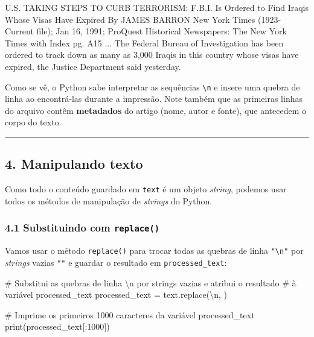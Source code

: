 \documentclass[
  brazilian,
  11pt,
]{article}
\newenvironment{Shaded}{\begin{snugshade}}{\end{snugshade}}
\newcommand{\BuiltInTok}[1]{\textcolor[rgb]{0.50,0.55,0.55}{#1}}
\newcommand{\CharTok}[1]{\textcolor[rgb]{0.24,0.68,0.91}{#1}}
\newcommand{\CommentTok}[1]{\textcolor[rgb]{0.48,0.49,0.49}{#1}}
\newcommand{\DecValTok}[1]{\textcolor[rgb]{0.96,0.45,0.00}{#1}}
\newcommand{\NormalTok}[1]{\textcolor[rgb]{0.81,0.81,0.76}{#1}}
\newcommand{\OperatorTok}[1]{\textcolor[rgb]{0.81,0.81,0.76}{#1}}
\newcommand{\StringTok}[1]{\textcolor[rgb]{0.96,0.31,0.31}{#1}}
\let\oldtexttt\texttt
\renewcommand{\texttt}[1]{{\color{inlink}\oldtexttt{#1}}}
\begin{document}
\begin{Shaded}
\begin{Highlighting}[]
\NormalTok{U.S. TAKING STEPS TO CURB TERRORISM: F.B.I. Is Ordered to Find Iraqis Whose Visas Have Expired}
\NormalTok{By JAMES BARRON}
\NormalTok{New York Times (1923{-}Current file); Jan 16, 1991;}
\NormalTok{ProQuest Historical Newspapers: The New York Times with Index pg. A15}
\NormalTok{...}
\NormalTok{   The Federal Bureau of Investigation has been ordered to track down as many as 3,000 Iraqis in this country whose visas have expired, the Justice Department said yesterday.}
\end{Highlighting}
\end{Shaded}

Como se vê, o Python sabe interpretar as sequências
\texttt{\textbackslash{}n} e insere uma quebra de linha ao encontrá‑las
durante a impressão. Note também que as primeiras linhas do arquivo
contêm \textbf{metadados} do artigo (nome, autor e fonte), que antecedem
o corpo do texto.

\begin{center}\rule{0.5\linewidth}{0.5pt}\end{center}

\subsection{4. Manipulando texto}\label{manipulando-texto}

Como todo o conteúdo guardado em \texttt{text} é um objeto
\emph{string}, podemos usar todos os métodos de manipulação de
\emph{strings} do Python.

\subsubsection{\texorpdfstring{4.1 Substituindo com
\texttt{replace()}}{4.1 Substituindo com replace()}}\label{substituindo-com-replace}

Vamos usar o método \texttt{replace()} para trocar todas as quebras de
linha \texttt{"\textbackslash{}n"} por \emph{strings} vazias \texttt{""}
e guardar o resultado em \texttt{processed\_text}:

\begin{Shaded}
\begin{Highlighting}[]
\CommentTok{\# Substitui as quebras de linha \textbackslash{}n por strings vazias e atribui o resultado}
\CommentTok{\# à variável \textquotesingle{}processed\_text\textquotesingle{}}
\NormalTok{processed\_text }\OperatorTok{=}\NormalTok{ text.replace(}\StringTok{\textquotesingle{}}\CharTok{\textbackslash{}n}\StringTok{\textquotesingle{}}\NormalTok{, }\StringTok{\textquotesingle{}\textquotesingle{}}\NormalTok{)}

\CommentTok{\# Imprime os primeiros 1000 caracteres da variável \textquotesingle{}processed\_text\textquotesingle{}}
\BuiltInTok{print}\NormalTok{(processed\_text[:}\DecValTok{1000}\NormalTok{])}
\end{Highlighting}
\end{Shaded}
\end{document}

